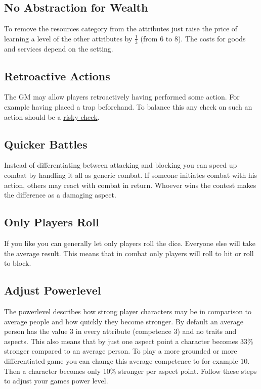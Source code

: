 \documentclass[11pt]{article}
\begin{document}
{\subsection{No Abstraction for Wealth}
\label{sec:orgcf2fb48}

To remove the resources category from the attributes just raise the price of learning a level of the other attributes by \(\frac{1}{3}\) (from 6 to 8). The costs for goods and services
depend on the setting.
\subsection{Retroactive Actions}
\label{sec:org58c2331}

The GM may allow players retroactively having performed some action. For example having placed a trap beforehand. To balance this any check on such an action should be a \hyperref[sec:org46016d5]{risky check}.
\subsection{Quicker Battles}
\label{sec:org3cee844}

Instead of differentiating between attacking and blocking you can speed up combat by handling it all as generic combat. If someone initiates combat with his action, others may react with combat in return. Whoever wins the contest makes the difference as a damaging aspect.
\subsection{Only Players Roll}
\label{sec:orga2bf562}
If you like you can generally let only players roll the dice. Everyone else will take the average result. This means that in combat only players will roll to hit or roll to block.
\subsection{Adjust Powerlevel}
\label{sec:org3f3f085}

The powerlevel describes how strong player characters may be in comparison to average people and how quickly they become stronger. By default an average person has the value \(3\) in every attribute (competence \(3\)) and no traits and aspects. This also means that by just one aspect point a character becomes 33\% stronger compared to an average person. To play a more grounded or more differentiated game you can change this average competence to for example \(10\). Then a character becomes only 10\% stronger per aspect point. Follow these steps to adjust your games power level.

}
\end{document}
